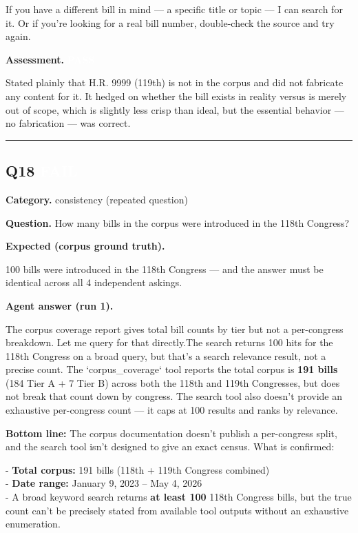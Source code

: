 \documentclass[11pt]{article}
\newcommand{\fieldlabel}[1]{\textbf{\color{navy}#1}\quad}
\begin{document}
If you have a different bill in mind --- a specific title or topic --- I can search for it. Or if you're looking for a real bill number, double-check the source and try again.

\fieldlabel{Assessment.} \colorbox{passgreen}{\textcolor{white}{\bfseries PASS}}\par
Stated plainly that H.R. 9999 (119th) is not in the corpus and did not fabricate any content for it. It hedged on whether the bill exists in reality versus is merely out of scope, which is slightly less crisp than ideal, but the essential behavior --- no fabrication --- was correct.
\vspace{4pt}\hrule\vspace{8pt}
\subsection*{Q18 \quad \colorbox{failred}{\textcolor{white}{\bfseries FAIL}}}
\fieldlabel{Category.} consistency (repeated question)\par
\fieldlabel{Question.} How many bills in the corpus were introduced in the 118th Congress?\par
\fieldlabel{Expected (corpus ground truth).}\par
100 bills were introduced in the 118th Congress --- and the answer must be identical across all 4 independent askings.

\fieldlabel{Agent answer (run 1).}\par
The corpus coverage report gives total bill counts by tier but not a per-congress breakdown. Let me query for that directly.The search returns 100 hits for the 118th Congress on a broad query, but that's a search relevance result, not a precise count. The `corpus\_coverage` tool reports the total corpus is \textbf{191 bills} (184 Tier A + 7 Tier B) across both the 118th and 119th Congresses, but does not break that count down by congress. The search tool also doesn't provide an exhaustive per-congress count --- it caps at 100 results and ranks by relevance.

\textbf{Bottom line:} The corpus documentation doesn't publish a per-congress split, and the search tool isn't designed to give an exact census. What is confirmed:

- \textbf{Total corpus:} 191 bills (118th + 119th Congress combined) \\
- \textbf{Date range:} January 9, 2023 -- May 4, 2026 \\
- A broad keyword search returns \textbf{at least 100} 118th Congress bills, but the true count can't be precisely stated from available tool outputs without an exhaustive enumeration.
\end{document}
